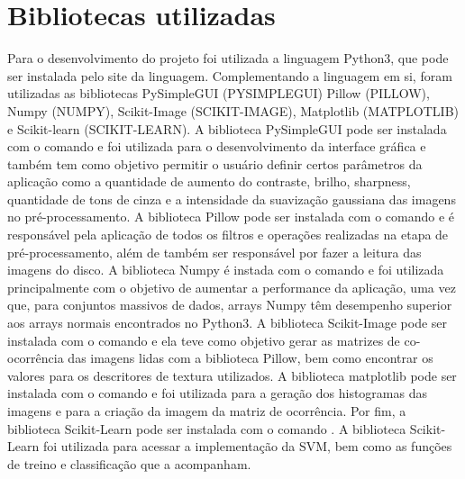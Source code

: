 \section{Bibliotecas utilizadas}

Para o desenvolvimento do projeto foi utilizada a linguagem Python3,
que pode ser instalada pelo site da linguagem. Complementando a linguagem 
em si, foram utilizadas as bibliotecas PySimpleGUI (PYSIMPLEGUI) 
Pillow (PILLOW), Numpy (NUMPY), 
Scikit-Image (SCIKIT-IMAGE), Matplotlib (MATPLOTLIB) 
e Scikit-learn (SCIKIT-LEARN). A biblioteca PySimpleGUI pode 
ser instalada com o comando  e foi utilizada para o desenvolvimento 
da interface gráfica e também tem como objetivo permitir o usuário definir certos parâmetros da 
aplicação como a quantidade de aumento do contraste, brilho, sharpness, quantidade de tons de cinza 
e a intensidade da suavização gaussiana das imagens no pré-processamento. A biblioteca Pillow pode 
ser instalada com o comando  e é responsável pela aplicação de todos os 
filtros e operações realizadas na etapa de pré-processamento, além de também ser responsável por 
fazer a leitura das imagens do disco. A biblioteca Numpy é instada com o comando  
e foi utilizada principalmente com o objetivo de aumentar a performance da aplicação, uma vez que, 
para conjuntos massivos de dados, arrays Numpy têm desempenho superior aos arrays normais encontrados 
no Python3. A biblioteca Scikit-Image pode ser instalada com o comando 
e ela teve como objetivo gerar as matrizes de co-ocorrência das imagens lidas com a biblioteca Pillow, 
bem como encontrar os valores para os descritores de textura utilizados. A biblioteca matplotlib pode 
ser instalada com o comando  e foi utilizada para a geração dos histogramas 
das imagens e para a criação da imagem da matriz de ocorrência. Por fim, a biblioteca Scikit-Learn pode 
ser instalada com o comando . A biblioteca Scikit-Learn foi utilizada 
para acessar a implementação da SVM, bem como as funções de treino e classificação que a acompanham.
